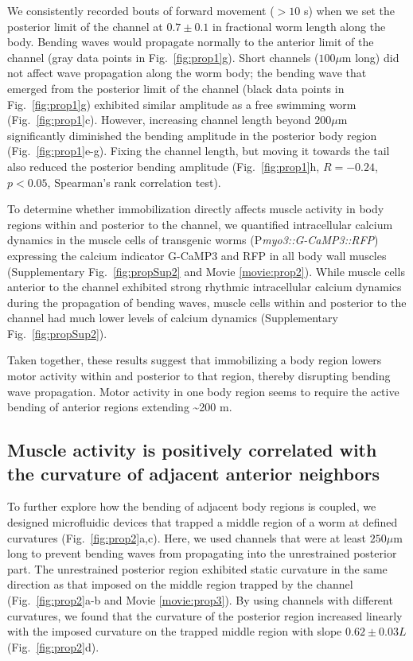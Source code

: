 We consistently recorded bouts of forward movement ($> 10$ s) when we set the posterior limit of 
the channel at $0.7 \pm 0.1$ in fractional worm length along the body. Bending waves would 
propagate normally to the anterior limit of the channel (gray data points in Fig.~\ref{fig:prop1}g). Short 
channels ($100 \mu$m long) did not affect wave propagation along the worm body; the bending wave 
that emerged from the posterior limit of the channel (black data points in Fig.~\ref{fig:prop1}g) exhibited 
similar amplitude as a free swimming worm (Fig.~\ref{fig:prop1}c). However, increasing channel length 
beyond $200 \mu$m significantly diminished the bending amplitude in the posterior body region (Fig.~\ref{fig:prop1}e-g). Fixing the channel length, but moving it towards the tail also reduced the posterior 
bending amplitude (Fig.~\ref{fig:prop1}h, $R = -0.24$, $p < 0.05$, Spearman’s rank correlation test).

To determine whether immobilization directly affects muscle activity in body regions within and 
posterior to the channel, we quantified intracellular calcium dynamics in the muscle cells of 
transgenic worms (P\textit{myo3::G-CaMP3::RFP}) expressing the calcium indicator G-CaMP3 \citep{tian_imaging_2009} and RFP in all body wall muscles (Supplementary Fig.~\ref{fig:propSup2} and Movie \ref{movie:prop2}). While 
muscle cells anterior to the channel exhibited strong rhythmic intracellular calcium dynamics 
during the propagation of bending waves, muscle cells within and posterior to the channel had 
much lower levels of calcium dynamics (Supplementary Fig.~\ref{fig:propSup2}).

Taken together, these results suggest that immobilizing a body region lowers motor activity 
within and posterior to that region, thereby disrupting bending wave propagation. Motor activity 
in one body region seems to require the active bending of anterior regions extending \textasciitilde200 \textmu m.

\subsection{Muscle activity is positively correlated with the curvature of adjacent anterior 
neighbors}
 
To further explore how the bending of adjacent body regions is coupled, we designed 
microfluidic devices that trapped a middle region of a worm at defined curvatures (Fig.~\ref{fig:prop2}a,c). 
Here, we used channels that were at least $250 \mu$m long to prevent bending waves from 
propagating into the unrestrained posterior part. The unrestrained posterior region exhibited 
static curvature in the same direction as that imposed on the middle region trapped by the 
channel (Fig.~\ref{fig:prop2}a-b and Movie  \ref{movie:prop3}). By using channels with different curvatures, we 
found that the curvature of the posterior region increased linearly with the imposed curvature on 
the trapped middle region with slope $0.62 \pm 0.03 L$ (Fig.~\ref{fig:prop2}d). 



